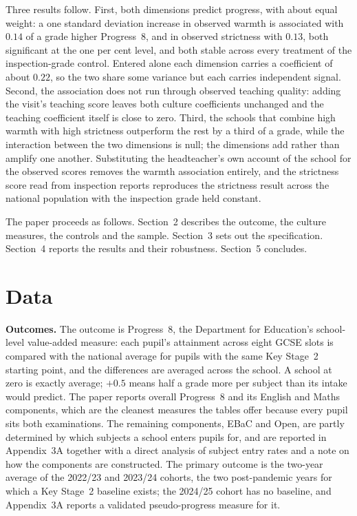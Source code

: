 Three results follow. First, both dimensions predict progress, with about
equal weight: a one standard deviation increase in observed warmth is
associated with $0.14$ of a grade higher Progress~8, and in observed
strictness with $0.13$, both significant at the one per cent level, and both
stable across every treatment of the inspection-grade control. Entered alone
each dimension carries a coefficient of about $0.22$, so the two share some
variance but each carries independent signal. Second, the association does not
run through observed teaching quality: adding the visit's teaching score
leaves both culture coefficients unchanged and the teaching coefficient
itself is close to zero. Third, the schools that combine high warmth with high
strictness outperform the rest by a third of a grade, while the interaction
between the two dimensions is null; the dimensions add rather than amplify
one another. Substituting the headteacher's own account of the school for the
observed scores removes the warmth association entirely, and the strictness
score read from inspection reports reproduces the strictness result across
the national population with the inspection grade held constant.

The paper proceeds as follows. Section~2 describes the outcome, the culture
measures, the controls and the sample. Section~3 sets out the specification.
Section~4 reports the results and their robustness. Section~5 concludes.

\section{Data}
\label{sec:p2_data}

\textbf{Outcomes.} The outcome is Progress~8, the Department for Education's
school-level value-added measure: each pupil's attainment across eight GCSE
slots is compared with the national average for pupils with the same Key
Stage~2 starting point, and the differences are averaged across the school. A
school at zero is exactly average; $+0.5$ means half a grade more per subject
than its intake would predict. The paper reports overall Progress~8 and its
English and Maths components, which are the cleanest measures the tables offer
because every pupil sits both examinations. The remaining components, EBaC and
Open, are partly determined by which subjects a school enters pupils for, and
are reported in Appendix~3A together with a direct analysis of subject entry
rates and a note on how the components are constructed. The primary outcome is
the two-year average of the 2022/23 and 2023/24 cohorts, the two post-pandemic
years for which a Key Stage~2 baseline exists; the 2024/25 cohort has no
baseline, and Appendix~3A reports a validated pseudo-progress measure for it.

